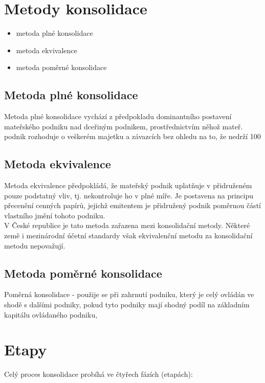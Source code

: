 \documentclass[12pt]{article}
\begin{document}
\section{Metody konsolidace} 
\begin{itemize}
\item metoda plné konsolidace
\item metoda ekvivalence
\item metoda poměrné konsolidace
\end{itemize}

\subsection{Metoda plné konsolidace}

Metoda plné konsolidace vychází z předpokladu dominantního postavení mateřského podniku nad dceřiným podnikem, prostřednictvím něhož mateř. podnik rozhoduje o veškerém majetku a závazcích bez ohledu na to, že nedrží 100%
 
\subsection{Metoda ekvivalence}

Metoda ekvivalence předpokládá, že mateřský podnik uplatňuje v přidruženém pouze podstatný vliv, tj. nekontroluje ho v plné míře. Je postavena na principu přecenění cenných papírů, jejichž emitentem je přidružený podnik poměrnou částí vlastního jmění tohoto podniku.
\\

V České republice je tato metoda zařazena mezi konsolidační metody. Některé země 
i mezinárodní účetní standardy však ekvivalenční metodu za konsolidační metodu nepovažují.

\subsection{Metoda poměrné konsolidace}

Poměrná konsolidace - použije se při zahrnutí podniku, který je celý ovládán ve shodě s dalšími podniky, pokud tyto podniky mají shodný podíl na základním kapitálu ovládaného podniku,

\section{Etapy}

Celý proces konsolidace probíhá ve čtyřech fázích (etapách):
\end{document}

